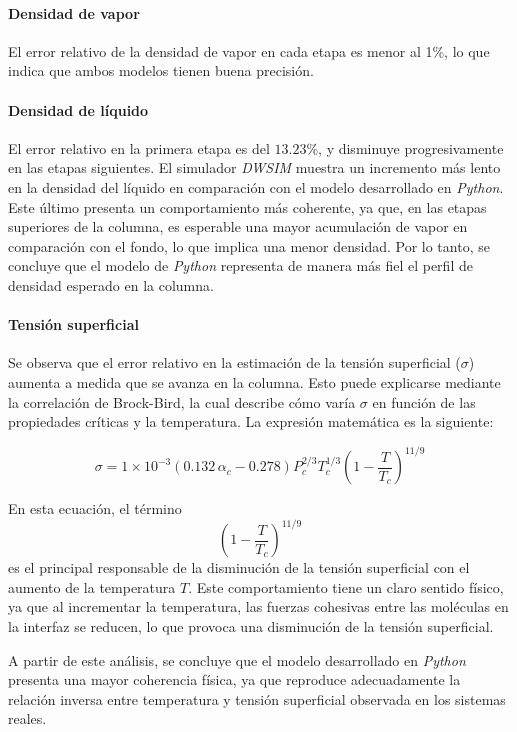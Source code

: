 \paragraph{Densidad de vapor}
El error relativo de la densidad de vapor en cada etapa es menor al 1\%, lo que indica que ambos modelos tienen buena precisión.
\paragraph{Densidad de líquido}
El error relativo en la primera etapa es del \(13.23\%\), y disminuye progresivamente en las etapas siguientes. El simulador \textit{DWSIM} muestra un incremento más lento en la densidad del líquido en comparación con el modelo desarrollado en \textit{Python}. Este último presenta un comportamiento más coherente, ya que, en las etapas superiores de la columna, es esperable una mayor acumulación de vapor en comparación con el fondo, lo que implica una menor densidad. Por lo tanto, se concluye que el modelo de \textit{Python} representa de manera más fiel el perfil de densidad esperado en la columna.
\paragraph{Tensión superficial}
Se observa que el error relativo en la estimación de la tensión superficial (\(\sigma\)) aumenta a medida que se avanza en la columna. Esto puede explicarse mediante la correlación de Brock-Bird, la cual describe cómo varía \(\sigma\) en función de las propiedades críticas y la temperatura. La expresión matemática es la siguiente:

\[
    \sigma = 1 \times 10^{-3} \left(0.132\,\alpha_c - 0.278\right) P_c^{2/3} T_c^{1/3} \left(1 - \frac{T}{T_c} \right)^{11/9}
\]

En esta ecuación, el término
$$
    \left(1 - \frac{T}{T_c} \right)^{11/9}
$$
es el principal responsable de la disminución de la tensión superficial con el aumento de la temperatura \(T\). Este comportamiento tiene un claro sentido físico, ya que al incrementar la temperatura, las fuerzas cohesivas entre las moléculas en la interfaz se reducen, lo que provoca una disminución de la tensión superficial.

A partir de este análisis, se concluye que el modelo desarrollado en \textit{Python} presenta una mayor coherencia física, ya que reproduce adecuadamente la relación inversa entre temperatura y tensión superficial observada en los sistemas reales.
